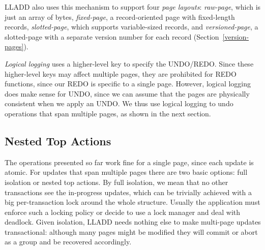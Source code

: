 \documentclass[10pt,letterpaper,twocolumn,english]{article}
\newcommand{\yad}{LLADD\xspace}
\begin{document}

\yad also uses this mechanism to support four {\em page layouts}: 
{\em raw-page}, which is just an array of
bytes, {\em fixed-page}, a record-oriented page with fixed-length records,
{\em slotted-page}, which supports variable-sized records, and 
{\em versioned-page},  a slotted-page with a separate version number for 
each record (Section~\ref{version-pages}).  

{\em Logical logging} uses a higher-level key to specify the
UNDO/REDO.  Since these higher-level keys may affect multiple pages,
they are prohibited for REDO functions, since our REDO is specific to
a single page.  However, logical logging does make sense for UNDO,
since we can assume that the pages are physically consistent when we
apply an UNDO.  We thus use logical logging to undo operations that
span multiple pages, as shown in the next section.




\subsection{Nested Top Actions}
\label{nested-top-actions}

The operations presented so far work fine for a single page, since
each update is atomic.  For updates that span multiple pages there 
are two basic options: full isolation or nested top actions.
By full isolation, we mean that no other transactions see the
in-progress updates, which can be trivially achieved with a big per-transaction lock
around the whole structure.  Usually the application must enforce 
such a locking policy or decide to use a lock manager and deal with 
deadlock.  Given isolation, \yad needs nothing else to
make multi-page updates transactional: although many pages might be
modified they will commit or abort as a group and be recovered
accordingly.
\end{document}
